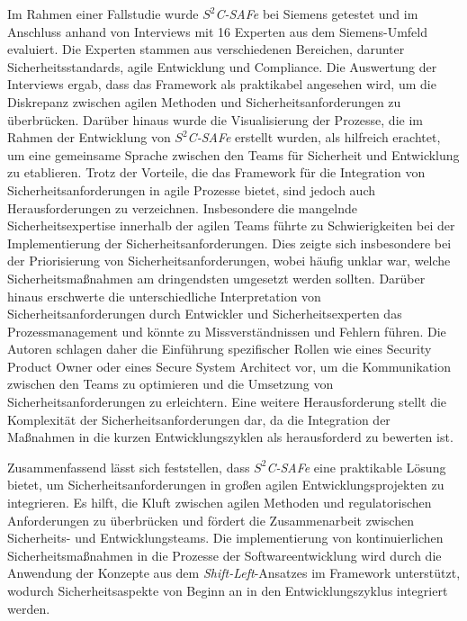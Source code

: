 \documentclass[acmtog]{acmart}
\begin{document}
Im Rahmen einer Fallstudie wurde \textit{$S^2$C-SAFe} bei Siemens getestet und im Anschluss anhand von Interviews mit 16 Experten aus dem Siemens-Umfeld evaluiert.
Die Experten stammen aus verschiedenen Bereichen, darunter Sicherheitsstandards, agile Entwicklung und Compliance. Die Auswertung der Interviews ergab, 
dass das Framework als praktikabel angesehen wird, um die Diskrepanz zwischen agilen Methoden und Sicherheitsanforderungen zu überbrücken. \cite{moyon_how_2020} 
Darüber hinaus wurde die Visualisierung der Prozesse, die im Rahmen der Entwicklung von \textit{$S^2$C-SAFe} erstellt wurden, als hilfreich erachtet, 
um eine gemeinsame Sprache zwischen den Teams für Sicherheit und Entwicklung zu etablieren. \cite{moyon_how_2020} 
Trotz der Vorteile, die das Framework für die Integration von Sicherheitsanforderungen in agile Prozesse bietet, sind jedoch auch Herausforderungen zu verzeichnen.
Insbesondere die mangelnde Sicherheitsexpertise innerhalb der agilen Teams führte zu Schwierigkeiten bei der Implementierung der Sicherheitsanforderungen. 
Dies zeigte sich insbesondere bei der Priorisierung von Sicherheitsanforderungen, wobei häufig unklar war, welche Sicherheitsmaßnahmen am dringendsten umgesetzt werden sollten. \cite{moyon_how_2020} 
Darüber hinaus erschwerte die unterschiedliche Interpretation von Sicherheitsanforderungen durch Entwickler und Sicherheitsexperten das Prozessmanagement und könnte zu Missverständnissen und Fehlern führen. 
Die Autoren schlagen daher die Einführung spezifischer Rollen wie eines Security Product Owner oder eines Secure System Architect vor, 
um die Kommunikation zwischen den Teams zu optimieren und die Umsetzung von Sicherheitsanforderungen zu erleichtern. \cite{moyon_how_2020}
Eine weitere Herausforderung stellt die Komplexität der Sicherheitsanforderungen dar, da die Integration der Maßnahmen in die kurzen Entwicklungszyklen als herausforderd zu bewerten ist. \cite{moyon_how_2020}

Zusammenfassend lässt sich feststellen, dass \textit{$S^2$C-SAFe} eine praktikable Lösung bietet, um Sicherheitsanforderungen in großen agilen Entwicklungsprojekten zu integrieren.
Es hilft, die Kluft zwischen agilen Methoden und regulatorischen Anforderungen zu überbrücken und fördert die Zusammenarbeit zwischen Sicherheits- und Entwicklungsteams. \cite{moyon_how_2020}
Die implementierung von kontinuierlichen Sicherheitsmaßnahmen in die Prozesse der Softwareentwicklung wird durch die Anwendung der Konzepte aus dem \textit{Shift-Left}-Ansatzes im Framework unterstützt,
wodurch Sicherheitsaspekte von Beginn an in den Entwicklungszyklus integriert werden.
\end{document}
